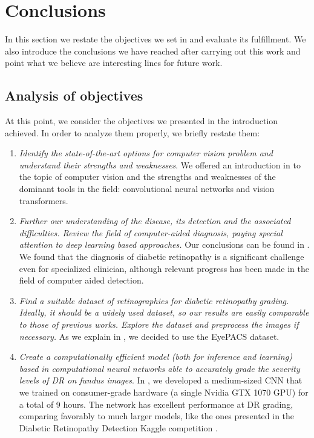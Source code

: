 \chapter{Conclusions} \label{chapter9}
In this section we restate the objectives we set in  and evaluate its fulfillment. We also introduce the conclusions we have reached after carrying out this work and point what we believe are interesting lines for future work.

\section{Analysis of objectives}
At this point, we consider the objectives we presented in the introduction achieved. In order to analyze them properly, we briefly restate them:

\begin{enumerate}[label=(O\arabic*)]
    \item \textit{Identify the state-of-the-art options for computer vision problem and understand their strengths and weaknesses}. We offered an introduction in  to the topic of computer vision and the strengths and weaknesses of the dominant tools in the field: convolutional neural networks and vision transformers.
    \item \textit{Further our understanding of the disease, its detection and the associated difficulties. Review the field of computer-aided diagnosis, paying special attention to deep learning based approaches.} Our conclusions can be found in . We found that the diagnosis of diabetic retinopathy is a significant challenge even for specialized clinician, although relevant progress has been made in the field of computer aided detection.
    \item \textit{Find a suitable dataset of retinographies for diabetic retinopathy grading. Ideally, it should be a widely used dataset, so our results are easily comparable to those of previous works. Explore the dataset and preprocess the images if necessary.} As we explain in , we decided to use the EyePACS dataset.
    \item \textit{Create a computationally efficient model (both for inference and learning) based in computational neural networks able to accurately grade the severity levels of DR on fundus images}. In , we developed a medium-sized CNN that we trained on consumer-grade hardware (a single Nvidia GTX 1070 GPU) for a total of 9 hours. The network has excellent performance at DR grading, comparing favorably to much larger models, like the ones presented in the Diabetic Retinopathy Detection Kaggle competition \cite{diabeticretinopathydetection, secondTeam, thirdTeam}.


\end{enumerate}
